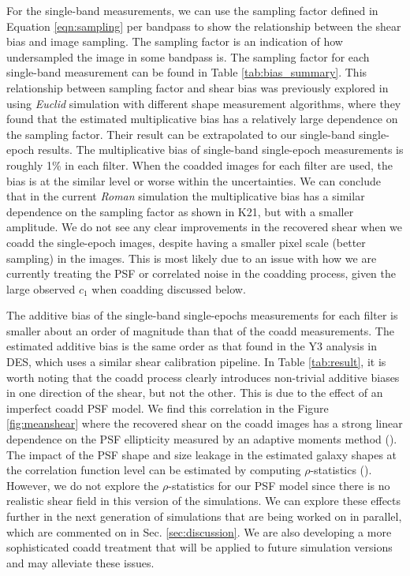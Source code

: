 \documentclass[fleqn,usenatbib]{mnras}
\begin{document}
For the single-band measurements, we can use the sampling factor defined in Equation \ref{eqn:sampling} per bandpass to show the relationship between the shear bias and image sampling. The sampling factor is an indication of how undersampled the image in some bandpass is. The sampling factor for each single-band measurement can be found in Table \ref{tab:bias_summary}. This relationship between sampling factor and shear bias was previously explored in \citealt{2021MNRAS.502.4048K} using \emph{Euclid} simulation with different shape measurement algorithms, where they found that the estimated multiplicative bias has a relatively large dependence on the sampling factor. Their result can be extrapolated to our single-band single-epoch results. The multiplicative bias of single-band single-epoch measurements is roughly 1\% in each filter. When the coadded images for each filter are used, the bias is at the similar level or worse within the uncertainties. We can conclude that in the current \emph{Roman} simulation the multiplicative bias has a similar dependence on the sampling factor as shown in K21, but with a smaller amplitude. We do not see any clear improvements in the recovered shear when we coadd the single-epoch images, despite having a smaller pixel scale (better sampling) in the images. This is most likely due to an issue with how we are currently treating the PSF or correlated noise in the coadding process, given the large observed $c_1$ when coadding discussed below. 

The additive bias of the single-band single-epochs measurements for each filter is smaller about an order of magnitude than that of the coadd measurements. The estimated additive bias is the same order as that found in the Y3 analysis in DES, which uses a similar shear calibration pipeline. In Table \ref{tab:result}, it is worth noting that the coadd process clearly introduces non-trivial additive biases in one direction of the shear, but not the other. This is due to the effect of an imperfect coadd PSF model. We find this correlation in the Figure \ref{fig:meanshear} where the recovered shear on the coadd images has a strong linear dependence on the PSF ellipticity measured by an adaptive moments method (\citealt{2003MNRAS.343..459H}). The impact of the PSF shape and size leakage in the estimated galaxy shapes at the correlation function level can be estimated by computing $\rho$-statistics (\citealt{2008A&A...484...67P, 2010MNRAS.404..350R, 2016MNRAS.460.2245J}). However, we do not explore the $\rho$-statistics for our PSF model since there is no realistic shear field in this version of the simulations. We can explore these effects further in the next generation of simulations that are being worked on in parallel, which are commented on in Sec. \ref{sec:discussion}. We are also developing a more sophisticated coadd treatment that will be applied to future simulation versions and may alleviate these issues.
\end{document}
